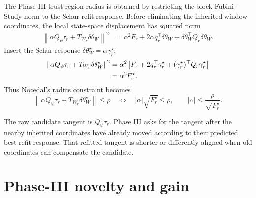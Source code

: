 \documentclass[10pt,twocolumn]{article}
\begin{document}
The Phase-III trust-region radius is obtained by restricting the block Fubini--Study norm to the Schur-refit response. Before eliminating the inherited-window coordinates, the local state-space displacement has squared norm
\begin{align}
\left\|
\alpha Q_\psi\tau_r+T_{W_r}\delta\theta_W
\right\|^2
&=
\alpha^2F_r
+2\alpha q_r^\top\delta\theta_W
+\delta\theta_W^\top Q_r\delta\theta_W .
\label{eq:phase3_block_fs_nocedal}
\end{align}
Insert the Schur response \(\delta\theta_W^\star=\alpha\gamma_r^\star\):
\begin{align}
\left\|
\alpha Q_\psi\tau_r+T_{W_r}\delta\theta_W^\star
\right\|^2
&=
\alpha^2
\left[
F_r+2q_r^\top\gamma_r^\star
+(\gamma_r^\star)^\top Q_r\gamma_r^\star
\right]
\notag\\
&=\alpha^2F_r^\star.
\label{eq:phase3_trust_region_collapse_nocedal}
\end{align}
Thus Nocedal's radius constraint becomes
\begin{equation}
\left\|
\alpha Q_\psi\tau_r+T_{W_r}\delta\theta_W^\star
\right\|\le\rho
\quad\Longleftrightarrow\quad
|\alpha|\sqrt{F_r^\star}\le\rho,
\qquad
|\alpha|\le\frac{\rho}{\sqrt{F_r^\star}}.
\label{eq:phase3_alpha_bound_nocedal}
\end{equation}

\begin{intuitionbox}
The raw candidate tangent is \(Q_\psi\tau_r\). Phase III asks for the tangent after the nearby inherited coordinates have already moved according to their predicted best refit response. That refitted tangent is shorter or differently aligned when old coordinates can compensate the candidate.
\end{intuitionbox}

\section{Phase-III novelty and gain}
\end{document}
